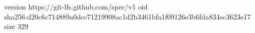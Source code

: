 version https://git-lfs.github.com/spec/v1
oid sha256:d20c6c714889a0dcc71219908ac1d2b3461bfa1f09126e3b6fda834ec3623e17
size 329
